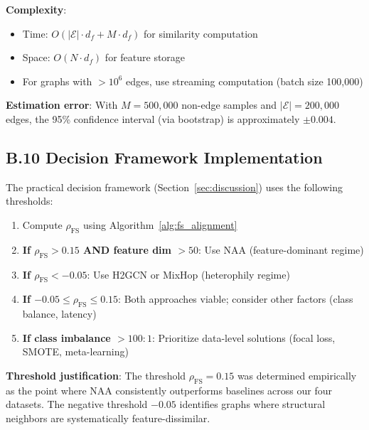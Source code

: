 \textbf{Complexity}:
\begin{itemize}
\item Time: $O(|\mathcal{E}| \cdot d_f + M \cdot d_f)$ for similarity computation
\item Space: $O(N \cdot d_f)$ for feature storage
\item For graphs with $>10^6$ edges, use streaming computation (batch size 100,000)
\end{itemize}

\textbf{Estimation error}:
With $M = 500{,}000$ non-edge samples and $|\mathcal{E}| = 200{,}000$ edges, the 95\% confidence interval (via bootstrap) is approximately $\pm 0.004$.

\subsection*{B.10 Decision Framework Implementation}

The practical decision framework (Section~\ref{sec:discussion}) uses the following thresholds:

\begin{enumerate}
\item Compute $\rho_{\text{FS}}$ using Algorithm~\ref{alg:fs_alignment}
\item \textbf{If $\rho_{\text{FS}} > 0.15$ AND feature dim $> 50$}: Use NAA (feature-dominant regime)
\item \textbf{If $\rho_{\text{FS}} < -0.05$}: Use H2GCN or MixHop (heterophily regime)
\item \textbf{If $-0.05 \leq \rho_{\text{FS}} \leq 0.15$}: Both approaches viable; consider other factors (class balance, latency)
\item \textbf{If class imbalance $> 100{:}1$}: Prioritize data-level solutions (focal loss, SMOTE, meta-learning)
\end{enumerate}

\textbf{Threshold justification}: The threshold $\rho_{\text{FS}} = 0.15$ was determined empirically as the point where NAA consistently outperforms baselines across our four datasets. The negative threshold $-0.05$ identifies graphs where structural neighbors are systematically feature-dissimilar.

